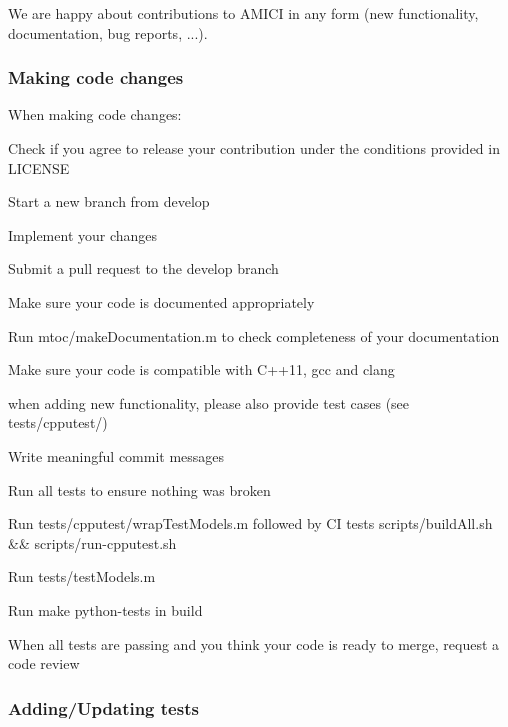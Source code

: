 We are happy about contributions to A\+M\+I\+CI in any form (new functionality, documentation, bug reports, ...).

\subsubsection*{Making code changes}

When making code changes\+:


\begin{DoxyItemize}
\item Check if you agree to release your contribution under the conditions provided in {\ttfamily L\+I\+C\+E\+N\+SE}
\item Start a new branch from {\ttfamily develop}
\item Implement your changes
\item Submit a pull request to the {\ttfamily develop} branch
\item Make sure your code is documented appropriately
\begin{DoxyItemize}
\item Run {\ttfamily mtoc/make\+Documentation.\+m} to check completeness of your documentation
\end{DoxyItemize}
\item Make sure your code is compatible with C++11, {\ttfamily gcc} and {\ttfamily clang}
\item when adding new functionality, please also provide test cases (see {\ttfamily tests/cpputest/})
\item Write meaningful commit messages
\item Run all tests to ensure nothing was broken
\begin{DoxyItemize}
\item Run {\ttfamily tests/cpputest/wrap\+Test\+Models.\+m} followed by CI tests {\ttfamily scripts/build\+All.\+sh \&\& scripts/run-\/cpputest.\+sh}
\item Run {\ttfamily tests/test\+Models.\+m}
\item Run {\ttfamily make python-\/tests} in {\ttfamily build}
\end{DoxyItemize}
\item When all tests are passing and you think your code is ready to merge, request a code review
\end{DoxyItemize}

\subsubsection*{Adding/\+Updating tests}

